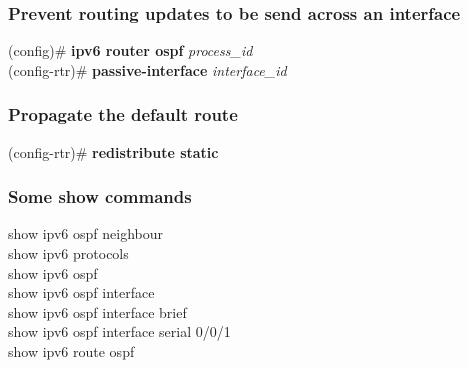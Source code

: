 \subsubsection*{Prevent routing updates to be send across an interface}
(config)\# \textbf{ipv6 router ospf} \textit{process\_id}\\
(config-rtr)\# \textbf{passive-interface} \textit{interface\_id}
\subsubsection*{Propagate the default route}
(config-rtr)\# \textbf{redistribute static}
\subsubsection*{Some show commands}
show ipv6 ospf neighbour\\
show ipv6 protocols\\
show ipv6 ospf\\
show ipv6 ospf interface\\
show ipv6 ospf interface brief\\
show ipv6 ospf interface serial 0/0/1\\
show ipv6 route ospf
